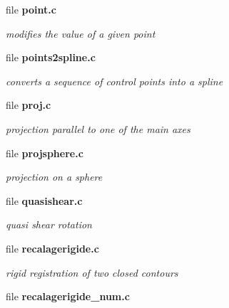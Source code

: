 \begin{DoxyCompactItemize}
\item 
file {\bf point.c}


\begin{DoxyCompactList}\small\item\em modifies the value of a given point \item\end{DoxyCompactList}

\item 
file {\bf points2spline.c}


\begin{DoxyCompactList}\small\item\em converts a sequence of control points into a spline \item\end{DoxyCompactList}

\item 
file {\bf proj.c}


\begin{DoxyCompactList}\small\item\em projection parallel to one of the main axes \item\end{DoxyCompactList}

\item 
file {\bf projsphere.c}


\begin{DoxyCompactList}\small\item\em projection on a sphere \item\end{DoxyCompactList}

\item 
file {\bf quasishear.c}


\begin{DoxyCompactList}\small\item\em quasi shear rotation \item\end{DoxyCompactList}

\item 
file {\bf recalagerigide.c}


\begin{DoxyCompactList}\small\item\em rigid registration of two closed contours \item\end{DoxyCompactList}

\item 
file {\bf recalagerigide\_\-num.c}



\end{DoxyCompactItemize}
